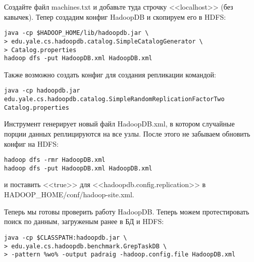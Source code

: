 Создайте файл machines.txt и добавьте туда строчку <<localhost>> (без кавычек). Тепер создадим конфиг HadoopDB и скопируем его в HDFS:
\begin{lstlisting}[label=lst:haddop23,caption=Тестирование]
java -cp $HADOOP_HOME/lib/hadoopdb.jar \
> edu.yale.cs.hadoopdb.catalog.SimpleCatalogGenerator \
> Catalog.properties
hadoop dfs -put HadoopDB.xml HadoopDB.xml
\end{lstlisting}

Также возможно создать конфиг для создания репликации командой:
\begin{lstlisting}[label=lst:haddop23:1,caption=Репликация]
java -cp hadoopdb.jar edu.yale.cs.hadoopdb.catalog.SimpleRandomReplicationFactorTwo Catalog.properties
\end{lstlisting}

Инструмент генерирует новый файл HadoopDB.xml, в котором случайные порции данных реплицируются на все узлы.
После этого не забываем обновить конфиг на HDFS:
\begin{lstlisting}[label=lst:haddop23:2,caption=Обновляем конфиг]
hadoop dfs -rmr HadoopDB.xml
hadoop dfs -put HadoopDB.xml HadoopDB.xml
\end{lstlisting}
и поставить <<true>> для <<hadoopdb.config.replication>> в HADOOP\_HOME/conf/hadoop-site.xml.

Теперь мы готовы проверить работу HadoopDB. Теперь можем протестировать поиск по данным, загруженым ранее в БД и HDFS:
\begin{lstlisting}[label=lst:haddop24,caption=Тестирование]
java -cp $CLASSPATH:hadoopdb.jar \
> edu.yale.cs.hadoopdb.benchmark.GrepTaskDB \
> -pattern %wo% -output padraig -hadoop.config.file HadoopDB.xml
\end{lstlisting}


